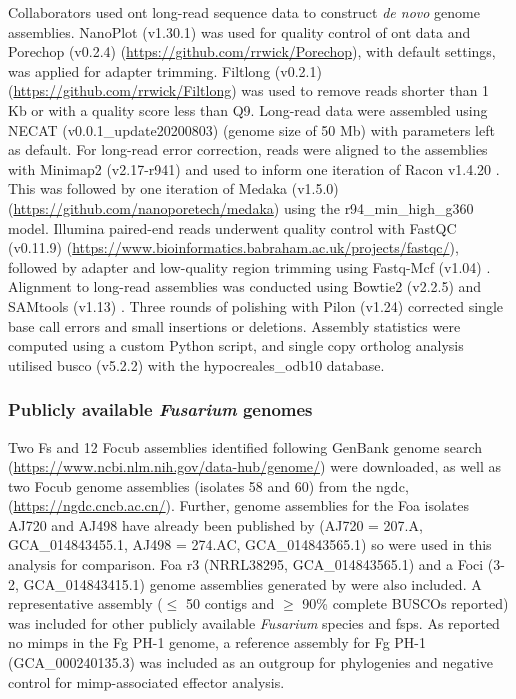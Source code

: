 Collaborators used \Ac{ont} long-read sequence data to construct \textit{de novo} genome assemblies. NanoPlot (v1.30.1) \parencite{DeCoster2018} was used for quality control of \ac{ont} data and Porechop (v0.2.4) (\href{https://github.com/rrwick/Porechop}{https://github.com/rrwic\-k/Porechop}), with default settings, was applied for adapter trimming. Filtlong (v0.2.1)  (\href{https://github.com/rrwick/Filtlong}{https://github.com/rrwick/Filtlong}) was used to remove reads shorter than 1 Kb or with a quality score less than Q9. Long-read data were assembled using NECAT (v0.0.1\_update20200803) \parencite{Chen2021} (genome size of 50 Mb) with parameters left as default. For long-read error correction, reads were aligned to the assemblies with Minimap2 (v2.17-r941) \parencite{Li2018} and used to inform one iteration of Racon v1.4.20 \parencite{Vaser2017}. This was followed by one iteration of Medaka (v1.5.0) (\href{https://github.com/nanoporetech/medaka}{https://github.com/nanoporetech/medaka}) using the r94\_min\_high\_g360 model. Illumina paired-end reads underwent quality control with FastQC (v0.11.9) (\href{https://www.bioinformatics.babraham.ac.uk/projects/fastqc/}{https://www.bioinformatics.babraham.ac.uk/projects/fastqc/}), followed by adapter and low-quality region trimming using Fastq-Mcf (v1.04) \parencite{Aronesty2013}. Alignment to long-read assemblies was conducted using Bowtie2 (v2.2.5) \parencite{Langmead2012} and SAMtools (v1.13) \Parencite{Danecek2021}. Three rounds of polishing with Pilon (v1.24) \parencite{Walker2014} corrected single base call errors and small insertions or deletions. Assembly statistics were computed using a custom Python script, and single copy ortholog analysis utilised \ac{busco} (v5.2.2) \parencite{Simao2015} with the hypocreales\_odb10 database.

\subsubsection{Publicly available \textit{Fusarium} genomes}

Two \ac{Fs} and 12 \ac{Focub} assemblies identified following GenBank genome search (\href{https://www.ncbi.nlm.nih.gov/data-hub/genome}{https://ww\-w.ncbi.nlm.nih.gov/data-hub/genome/}) were downloaded, as well as two \ac{Focub} genome assemblies (isolates 58 and 60) from the \ac{ngdc}, (\href{https://ngdc.cncb.ac.cn}{https:/\-/ngdc.cncb.ac.cn/}). Further, genome assemblies for the \ac{Foa} isolates AJ720 and AJ498 have already been published by \textcite{Henry2020} (AJ720 = 207.A, GCA\_014843455.1,  AJ498 = 274.AC, GCA\_014843565.1) so were used in this analysis for comparison. \Ac{Foa} \ac{r3} (NRRL38295, GCA\_014843565.1) and a \ac{Foci} (3-2, GCA\_014843415.1) genome assemblies generated by \textcite{Henry2020} were also included. A representative assembly (\( \leq \) 50 contigs and \(\geq \) 90\% complete BUSCOs reported) was included for other publicly available \textit{Fusarium} species and \acp{fsp}. As \textcite{Schmidt2013} reported no \acp{mimp} in the \ac{Fg} PH-1 genome, a reference assembly for \ac{Fg} PH-1 (GCA\_000240135.3) was included as an outgroup for phylogenies and negative control for \ac{mimp}-associated effector analysis.

